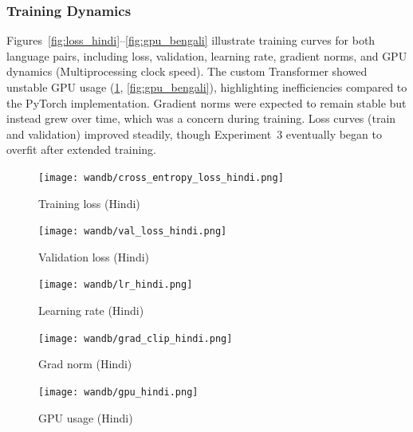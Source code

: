 \documentclass[11pt, oneside]{article}   	%
\begin{document}
\subsubsection{Training Dynamics}  
Figures~\ref{fig:loss_hindi}--\ref{fig:gpu_bengali} illustrate training curves for both language pairs, including loss, validation, learning rate, gradient norms, and GPU dynamics (Multiprocessing clock speed). The custom Transformer showed unstable GPU usage (\ref{fig:gpu_hindi}, \ref{fig:gpu_bengali}), highlighting inefficiencies compared to the PyTorch implementation. Gradient norms were expected to remain stable but instead grew over time, which was a concern during training. Loss curves (train and validation) improved steadily, though Experiment~3 eventually began to overfit after extended training.


\begin{figure}[h]
\centering
\begin{minipage}{0.18\textwidth}
    \centering
    \texttt{[image: wandb/cross\_entropy\_loss\_hindi.png]}
    \caption{Training loss (Hindi)}
    \label{fig:loss_hindi}
\end{minipage}
\hfill
\begin{minipage}{0.18\textwidth}
    \centering
    \texttt{[image: wandb/val\_loss\_hindi.png]}
    \caption{Validation loss (Hindi)}
    \label{fig:val_loss_hindi}
\end{minipage}
\hfill
\begin{minipage}{0.18\textwidth}
    \centering
    \texttt{[image: wandb/lr\_hindi.png]}
    \caption{Learning rate (Hindi)}
    \label{fig:lr_hindi}
\end{minipage}
\hfill
\begin{minipage}{0.18\textwidth}
    \centering
    \texttt{[image: wandb/grad\_clip\_hindi.png]}
    \caption{Grad norm (Hindi)}
    \label{fig:grad_hindi}
\end{minipage}
\hfill
\begin{minipage}{0.18\textwidth}
    \centering
    \texttt{[image: wandb/gpu\_hindi.png]}
    \caption{GPU usage (Hindi)}
    \label{fig:gpu_hindi}
\end{minipage}
\end{figure}
\end{document}
